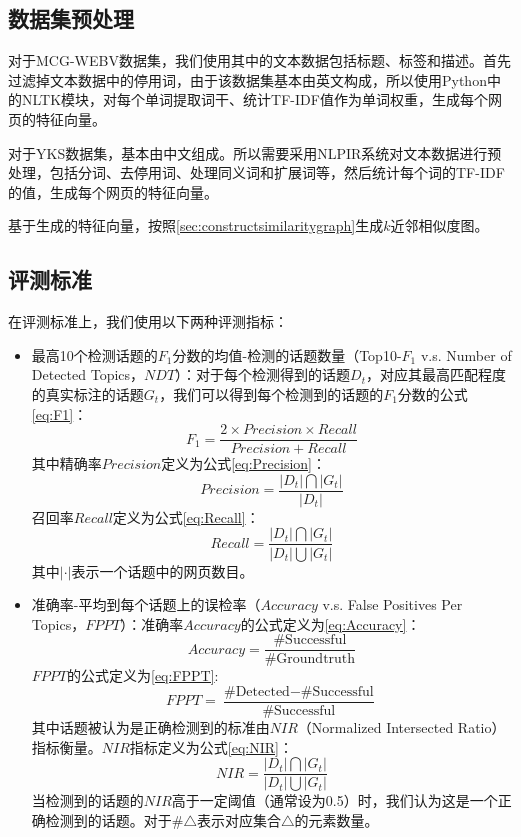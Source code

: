 \subsection{数据集预处理}

对于MCG-WEBV数据集，我们使用其中的文本数据包括标题、标签和描述。首先过滤掉文本数据中的停用词，由于该数据集基本由英文构成，所以使用Python中的NLTK模块，对每个单词提取词干、统计TF-IDF值作为单词权重，生成每个网页的特征向量。

对于YKS数据集，基本由中文组成。所以需要采用NLPIR系统对文本数据进行预处理，包括分词、去停用词、处理同义词和扩展词等，然后统计每个词的TF-IDF的值，生成每个网页的特征向量。

基于生成的特征向量，按照\ref{sec:constructsimilaritygraph}生成$k$近邻相似度图。

\subsection{评测标准}
在评测标准上，我们使用以下两种评测指标：
\begin{itemize}
  \item 最高10个检测话题的$F_1$分数的均值-检测的话题数量（Top10-$F_1$ v.s. Number of Detected Topics，$NDT$）：对于每个检测得到的话题$D_t$，对应其最高匹配程度的真实标注的话题$G_t$，我们可以得到每个检测到的话题的$F_1$分数的公式\ref{eq:F1}：
  \begin{equation}\label{eq:F1}
    F_1 = \frac{2\times Precision \times Recall}{Precision + Recall}
  \end{equation}
  其中精确率$Precision$定义为公式\ref{eq:Precision}：
  \begin{equation}\label{eq:Precision}
    Precision = \frac{|D_t| \bigcap |G_t|}{|D_t|}
  \end{equation}
  召回率$Recall$定义为公式\ref{eq:Recall}：
  \begin{equation}\label{eq:Recall}
    Recall = \frac{|D_t| \bigcap |G_t|}{|D_t| \bigcup |G_t|}
  \end{equation}
  其中$|\cdot|$表示一个话题中的网页数目。

  \item 准确率-平均到每个话题上的误检率（$Accuracy$ v.s. False Positives Per Topics，$FPPT$）：准确率$Accuracy$的公式定义为\ref{eq:Accuracy}：
  \begin{equation}\label{eq:Accuracy}
    Accuracy = \frac{\text{\#Successful}}{\text{\#Groundtruth}}
  \end{equation}
  $FPPT$的公式定义为\ref{eq:FPPT}:
  \begin{equation}\label{eq:FPPT}
     FPPT = \frac{\text{\#Detected} - \text{\#Successful}}{\text{\#Successful}}
  \end{equation}
  其中话题被认为是正确检测到的标准由$NIR$（Normalized Intersected Ratio）指标衡量。$NIR$指标定义为公式\ref{eq:NIR}：
  \begin{equation}\label{eq:NIR}
    NIR = \frac{|D_t| \bigcap |G_t|}{|D_t| \bigcup |G_t|}
  \end{equation}
  当检测到的话题的$NIR$高于一定阈值（通常设为0.5）\citep{pang-2013-unsupervised}时，我们认为这是一个正确检测到的话题。对于$\# \triangle$表示对应集合$\triangle$的元素数量。
\end{itemize}

